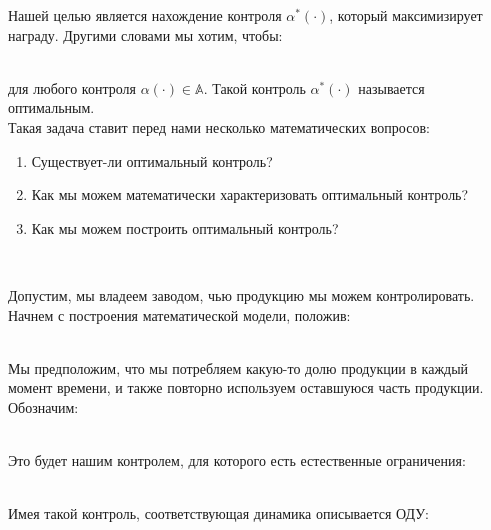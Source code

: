 
Нашей целью является нахождение контроля $\alpha^*(\cdot)$, который максимизирует награду. Другими словами мы хотим, чтобы: \\

\

для любого контроля $\alpha(\cdot) \in \mathbb{A}$. Такой контроль $\alpha^*(\cdot)$ называется оптимальным. \\

Такая задача ставит перед нами несколько математических вопросов: \\

\begin{enumerate}
  \item Существует-ли оптимальный контроль?
  \item Как мы можем математически характеризовать оптимальный контроль?
  \item Как мы можем построить оптимальный контроль?
\end{enumerate}
\



Допустим, мы владеем заводом, чью продукцию мы можем контролировать. Начнем с построения математической модели, положив: \\

\

Мы предположим, что мы потребляем какую-то долю продукции в каждый момент времени, и также повторно используем оставшуюся часть продукции. Обозначим: \\

\

Это будет нашим контролем, для которого есть естественные ограничения: \\

\

Имея такой контроль, соответствующая динамика описывается ОДУ: \\

